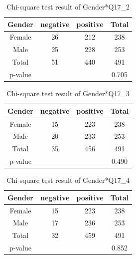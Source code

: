\begin{table}[h]
  \caption{Chi-square test result of Gender*Q17\_2 }
  \label{table31b}
  \centering
\begin{tabular}{c|ccc}
\hline
Gender & negative & positive & Total \\
\hline
Female & 26                           & 212                          & 238                       \\
Male   & 25                          & 228                         & 253                       \\
Total  & 51                           & 440                          & 491                       \\
\hline
p-value      &        &      & 0.705   \\
\hline                   
\end{tabular}
\end{table}

\begin{table}[h]
  \caption{Chi-square test result of Gender*Q17\_3 }
  \label{table31c}
  \centering
\begin{tabular}{c|ccc}
\hline
Gender & negative & positive & Total \\
\hline
Female & 15                           & 223                          & 238                       \\
Male   & 20                          & 233                       & 253                       \\
Total  & 35                           & 456                          & 491                       \\
\hline
p-value     &        &      & 0.490   \\
\hline                   
\end{tabular}
\end{table}

\begin{table}[h]
  \caption{Chi-square test result of Gender*Q17\_4 }
  \label{table31d}
  \centering
\begin{tabular}{cccc}
\hline
Gender & negative & positive & Total \\
\hline
Female & 15                           & 223                          & 238                       \\
Male   & 17                         & 236                      & 253                       \\
Total  & 32                           & 459                          & 491                       \\
\hline
p-value      &        &      & 0.852   \\
\hline                   
\end{tabular}
\end{table}

